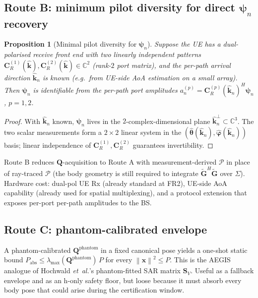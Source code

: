 \documentclass[11pt,a4paper]{article}
\newtheorem{proposition}[theorem]{Proposition}
\theoremstyle{definition}
\newcommand{\xx}{\mathbf{x}}
\newcommand{\kh}{\hat{\mathbf{k}}}
\newcommand{\Q}{\mathbf{Q}}
\newcommand{\Gt}{\widetilde{\mathbf{G}}}
\newcommand{\Cp}{\mathbf{C}}
\newcommand{\psib}{\boldsymbol{\psi}}
\newcommand{\Sigmaset}{\Sigma}
\newcommand{\C}{\mathbb{C}}
\newcommand{\lammax}{\lambda_{\max}}
\newcommand{\norm}[1]{\left\lVert #1 \right\rVert}
\begin{document}
\subsection{Route B: minimum pilot diversity for direct \texorpdfstring{$\psib_n$}{psi\_n} recovery}

\begin{proposition}[Minimal pilot diversity for $\psib_n$]
\label{prop:pilot-diversity}
Suppose the UE has a dual-polarised receive front end with two
linearly independent patterns $\Cp_R^{(1)}(\kh),\Cp_R^{(2)}(\kh)\in\C^2$
(rank-$2$ port matrix), and the per-path arrival direction $\kh_n$ is
known (e.g.\ from UE-side AoA estimation on a small array). Then
$\psib_n$ is identifiable from the per-path port amplitudes
$a_n^{(p)}=\Cp_R^{(p)}(\kh_n)^H\psib_n$, $p=1,2$.
\end{proposition}

\begin{proof}
With $\kh_n$ known, $\psib_n$ lives in the $2$-complex-dimensional plane
$\kh_n^\perp\subset\C^3$. The two scalar measurements form a $2\times 2$
linear system in the
$(\hat{\boldsymbol\theta}(\kh_n),\hat{\boldsymbol\varphi}(\kh_n))$ basis;
linear independence of $\Cp_R^{(1)},\Cp_R^{(2)}$ guarantees invertibility.
\end{proof}

Route B reduces $\Q$-acquisition to Route A with measurement-derived
$\mathcal{P}$ in place of ray-traced $\mathcal{P}$ (the body geometry is
still required to integrate $\Gt^H\Gt$ over $\Sigmaset$). Hardware cost:
dual-pol UE Rx (already standard at FR2), UE-side AoA capability
(already used for spatial multiplexing), and a protocol extension that
exposes per-port per-path amplitudes to the BS.

\subsection{Route C: phantom-calibrated envelope}

A phantom-calibrated $\Q^{\mathrm{phantom}}$ in a fixed canonical pose
yields a one-shot static bound
$P_{\mathrm{abs}} \le \lammax(\Q^{\mathrm{phantom}})\,P$ for every
$\norm{\xx}^2\le P$. This is the AEGIS analogue of Hochwald
\textit{et~al.}'s phantom-fitted SAR matrix $\mathbf{S}_V$. Useful as a
fallback envelope and as an h-only safety floor, but loose because it
must absorb every body pose that could arise during the certification
window.

\end{document}
